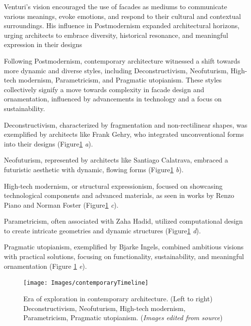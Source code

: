 Venturi's vision encouraged the use of facades as mediums to communicate various meanings, evoke emotions, and respond to their cultural and contextual surroundings.
His influence in Postmodernism expanded architectural horizons, urging architects to embrace diversity, historical resonance, and meaningful expression in their designs\cite{Lutolli2020, Stamp2016}


Following Postmodernism, contemporary architecture witnessed a shift towards more dynamic and diverse styles, including Deconstructivism, Neofuturism, High-tech modernism, Parametricism, and Pragmatic utopianism.
These styles collectively signify a move towards complexity in facade design and ornamentation, influenced by advancements in technology and a focus on sustainability.

Deconstructivism, characterized by fragmentation and non-rectilinear shapes, was exemplified by architects like Frank Gehry, who integrated unconventional forms into their designs (Figure\ref{fig:contemporarytimeline} \textit{a}).

Neofuturism, represented by architects like Santiago Calatrava, embraced a futuristic aesthetic with dynamic, flowing forms (Figure\ref{fig:contemporarytimeline} \textit{b}).

High-tech modernism, or structural expressionism, focused on showcasing technological components and advanced materials, as seen in works by Renzo Piano and Norman Foster (Figure\ref{fig:contemporarytimeline} \textit{c}).

Parametricism, often associated with Zaha Hadid, utilized computational design to create intricate geometries and dynamic structures (Figure\ref{fig:contemporarytimeline} \textit{d}).

Pragmatic utopianism, exemplified by Bjarke Ingels, combined ambitious visions with practical solutions, focusing on functionality, sustainability, and meaningful ornamentation (Figure \ref{fig:contemporarytimeline} \textit{e}).

\begin{figure}[htb]
\centering
\texttt{[image: Images/contemporaryTimeline]}
\caption{Era of exploration in contemporary architecture. (Left to right) Deconstructivism, Neofuturism, High-tech modernism, Parametricism, Pragmatic utopianism. (\textit{Images edited from source})}
\label{fig:contemporarytimeline}
\end{figure}

